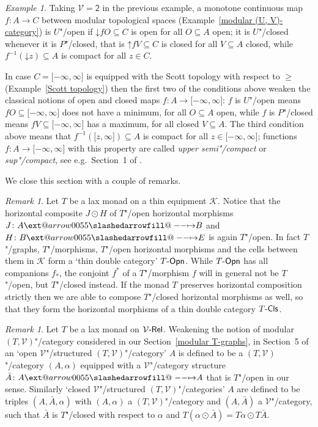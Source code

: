 \documentclass[preprint, a4paper]{elsarticle}
\makeatletter
\def\slashedarrowfill@#1#2#3#4#5{%
  $\m@th\thickmuskip0mu\medmuskip\thickmuskip\thinmuskip\thickmuskip
   \relax#5#1\mkern-7mu%
   \cleaders\hbox{$#5\mkern-2mu#2\mkern-2mu$}\hfill
   \mathclap{#3}\mathclap{#2}%
   \cleaders\hbox{$#5\mkern-2mu#2\mkern-2mu$}\hfill
   \mkern-7mu#4$%
}
\def\rightslashedarrowfill@{%
  \slashedarrowfill@\relbar\relbar\mapstochar\rightarrow}
\newcommand\xslashedrightarrow[2][]{%
  \ext@arrow 0055{\rightslashedarrowfill@}{#1}{#2}}
\def\slashedrightarrow{\xslashedrightarrow{}}
\theoremstyle{definition}
\theoremstyle{remark}
\newtheorem{remark}[theorem]{Remark}
\newtheorem{example}[theorem]{Example}
\providecommand{\exref}[1]{Example~\ref{#1}}
\providecommand{\secref}[1]{Section~\ref{#1}}
\providecommand{\brks}[1]{\lbrack #1 \rbrack}
\providecommand{\downset}{\mathord\downarrow}
\providecommand{\upset}{\mathord\uparrow}
\providecommand{\map}[3]{#1\colon#2\to#3}
\providecommand{\hmap}[3]{#1\colon#2\slashedrightarrow#3}
\providecommand{\inv}[1]{{#1}^{-1}}
\providecommand{\catvar}[1]{\mathcal{#1}}
\providecommand{\2}{\mathsf 2}
\providecommand{\K}{\catvar K}
\providecommand{\V}{\catvar V}
\providecommand{\Rel}{\mathsf{Rel}}
\providecommand{\enRel}[1]{#1\text-\Rel}
\providecommand{\hc}{\odot}
\makeatother
\begin{document}
	\begin{example} \label{open/closed maps between ordered topological spaces}
		Taking $\V = \2$ in the previous example, a monotone continuous map $\map fAC$ between modular topological spaces (\exref{modular (U, V)-category}) is $U$"/open if $\downset fO \subseteq C$ is open for all $O \subseteq A$ open; it is $U$"/closed whenever it is $P$"/closed, that is $\upset fV \subseteq C$ is closed for all $V \subseteq A$ closed, while $\inv f(\downset z) \subseteq A$ is compact for all $z \in C$.
		
		In case $C = \brks{-\infty, \infty}$ is equipped with the Scott topology with respect to $\geq$ (\exref{Scott topology}) then the first two of the conditions above weaken the classical notions of open and closed maps $\map fA{\brks{-\infty, \infty}}$: $f$ is $U$"/open means \mbox{$fO \subseteq \brks{-\infty, \infty}$} does not have a minimum, for all $O \subseteq A$ open, while $f$ is $P$"/closed means $fV \subseteq \brks{-\infty, \infty}$ has a maximum, for all closed $V \subseteq A$. The third condition above means that $\inv f(\brks{z, \infty}) \subseteq A$ is compact for all $z \in \brks{-\infty, \infty}$; functions $\map fA{\brks{-\infty, \infty}}$ with this property are called \emph{upper semi"/compact} or \emph{sup"/compact}, see e.g.\ Section~1 of \cite{Feinberg-Kasyanov15}.
	\end{example}
	
	We close this section with a couple of remarks.
	\begin{remark}
		Let $T$ be a lax monad on a thin equipment $\K$. Notice that the horizontal composite $J \hc H$ of $T$"/open horizontal morphisms $\hmap JAB$ and \mbox{$\hmap HBE$} is again $T$"/open. In fact $T$"/graphs, $T$"/morphisms, $T$"/open horizontal morphisms and the cells between them in $\K$ form a `thin double category' $T\text-\mathsf{Opn}$. While $T\text-\mathsf{Opn}$ has all companions $f_*$, the conjoint $f^*$ of a $T$"/morphism $f$ will in general not be $T$"/open, but $T$"/closed instead. If the monad $T$ preserves horizontal composition strictly then we are able to compose $T$"/closed horizontal morphisms as well, so that they form the horizontal morphisms of a thin double category $T\text-\mathsf{Cls}$.
	\end{remark}
	\begin{remark}
		Let $T$ be a lax monad on $\enRel\V$. Weakening the notion of modular $(T, \V)$"/category considered in our \secref{modular T-graphs}, in Section~5 of \cite{Tholen09} an `open $\V$"/structured $(T, \V)$"/category' $A$ is defined to be a $(T, \V)$"/category $(A, \alpha)$ equipped with a $\V$"/category structure $\hmap{\bar A}AA$ that is $T$"/open in our sense. Similarly `closed $\V$"/structured $(T, \V)$"/categories' $A$ are defined to be triples $(A, \bar A, \alpha)$ with $(A, \alpha)$ a $(T, \V)$"/category and $(A, \bar A)$ a $\V$"/category, such that $\bar A$ is $T$"/closed with respect to $\alpha$ and $T(\alpha \hc \bar A) = T\alpha \hc T\bar A$.
	\end{remark}
	
\end{document}
